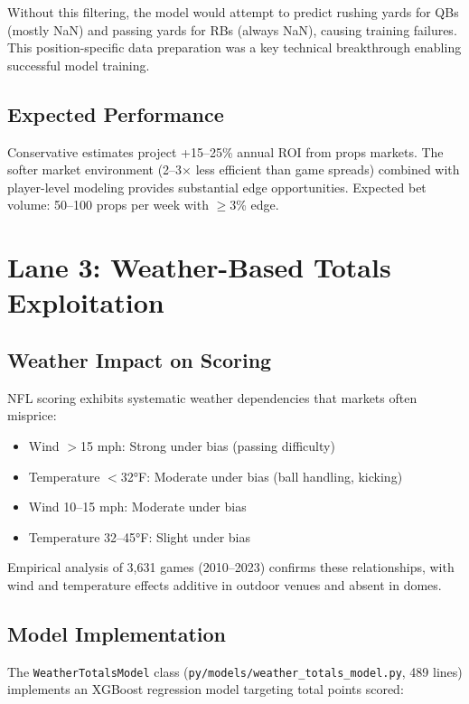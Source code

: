 Without this filtering, the model would attempt to predict rushing yards for QBs (mostly NaN) and passing yards for RBs (always NaN), causing training failures. This position-specific data preparation was a key technical breakthrough enabling successful model training.

\subsection{Expected Performance}

Conservative estimates project +15--25\% annual ROI from props markets. The softer market environment (2--3× less efficient than game spreads) combined with player-level modeling provides substantial edge opportunities. Expected bet volume: 50--100 props per week with $\geq$3\% edge.

\section{Lane 3: Weather-Based Totals Exploitation}

\subsection{Weather Impact on Scoring}

NFL scoring exhibits systematic weather dependencies that markets often misprice:
\begin{itemize}
  \item Wind $>$15 mph: Strong under bias (passing difficulty)
  \item Temperature $<$32°F: Moderate under bias (ball handling, kicking)
  \item Wind 10--15 mph: Moderate under bias
  \item Temperature 32--45°F: Slight under bias
\end{itemize}

Empirical analysis of 3,631 games (2010--2023) confirms these relationships, with wind and temperature effects additive in outdoor venues and absent in domes.

\subsection{Model Implementation}

The \texttt{WeatherTotalsModel} class (\texttt{py/models/weather\_totals\_model.py}, 489 lines) implements an XGBoost regression model targeting total points scored:

